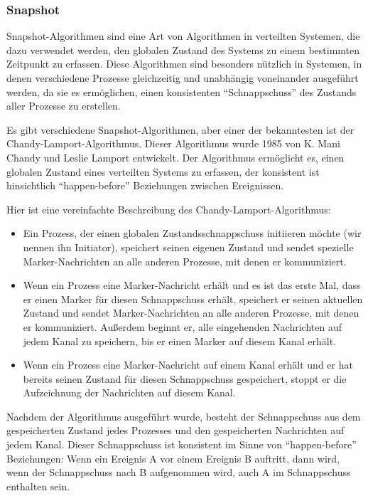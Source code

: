 \subsubsection{Snapshot}

Snapshot-Algorithmen sind eine Art von Algorithmen in verteilten Systemen, die dazu verwendet werden, den globalen Zustand des Systems zu einem bestimmten Zeitpunkt zu erfassen. Diese Algorithmen sind besonders nützlich in Systemen, in denen verschiedene Prozesse gleichzeitig und unabhängig voneinander ausgeführt werden, da sie es ermöglichen, einen konsistenten \enquote{Schnappschuss} des Zustands aller Prozesse zu erstellen.

Es gibt verschiedene Snapshot-Algorithmen, aber einer der bekanntesten ist der Chandy-Lamport-Algorithmus. Dieser Algorithmus wurde 1985 von K. Mani Chandy und Leslie Lamport entwickelt. Der Algorithmus ermöglicht es, einen globalen Zustand eines verteilten Systems zu erfassen, der konsistent ist hinsichtlich \enquote{happen-before} Beziehungen zwischen Ereignissen.

Hier ist eine vereinfachte Beschreibung des Chandy-Lamport-Algorithmus:
\begin{itemize}
\item Ein Prozess, der einen globalen Zustandsschnappschuss initiieren möchte (wir nennen ihn Initiator), speichert seinen eigenen Zustand und sendet spezielle Marker-Nachrichten an alle anderen Prozesse, mit denen er kommuniziert.
\item Wenn ein Prozess eine Marker-Nachricht erhält und es ist das erste Mal, dass er einen Marker für diesen Schnappschuss erhält, speichert er seinen aktuellen Zustand und sendet Marker-Nachrichten an alle anderen Prozesse, mit denen er kommuniziert. Außerdem beginnt er, alle eingehenden Nachrichten auf jedem Kanal zu speichern, bis er einen Marker auf diesem Kanal erhält.
\item Wenn ein Prozess eine Marker-Nachricht auf einem Kanal erhält und er hat bereits seinen Zustand für diesen Schnappschuss gespeichert, stoppt er die Aufzeichnung der Nachrichten auf diesem Kanal.
\end{itemize} 
Nachdem der Algorithmus ausgeführt wurde, besteht der Schnappschuss aus dem gespeicherten Zustand jedes Prozesses und den gespeicherten Nachrichten auf jedem Kanal. Dieser Schnappschuss ist konsistent im Sinne von \enquote{happen-before} Beziehungen: Wenn ein Ereignis A vor einem Ereignis B auftritt, dann wird, wenn der Schnappschuss nach B aufgenommen wird, auch A im Schnappschuss enthalten sein.



